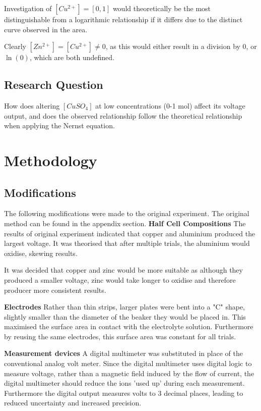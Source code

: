 \documentclass[11pt,a4paper]{article}
\begin{document}
Investigation of $[Cu^{2+}]=[0, 1]$ would theoretically be the most distinguishable from a logarithmic relationship if it differs due to the distinct curve observed in the area. 

Clearly $[Zn^{2+}]=[Cu^{2+}]\neq 0$, as this would either result in a division by 0, or $\ln(0)$, which are both undefined. 
\subsection{Research Question}
How does altering $[CuSO_4]$ at low concentrations (0-1 mol) affect its voltage output, and does the observed relationship follow the theoretical relationship when applying the Nernst equation.
\section{Methodology}
\subsection{Modifications}

The following modifications were made to the original experiment. The original method can be found in the appendix section.\newline
\textbf{Half Cell Compositions}\newline
The results of original experiment indicated that copper and aluminium produced the largest voltage. It was theorised that after multiple trials, the aluminium would oxidise, skewing results.

It was decided that copper and zinc would be more suitable as although they produced a smaller voltage, zinc would take longer to oxidise and therefore producer more consistent results.

\textbf{Electrodes}\newline
Rather than thin strips, larger plates were bent into a "C" shape, slightly smaller than the diameter of the beaker they would be placed in. This maximised the surface area in contact with the electrolyte solution. Furthermore by reusing the same electrodes, this surface area was constant for all trials.

\textbf{Measurement devices}\newline
A digital multimeter was substituted in place of the conventional analog volt meter. Since the digital multimeter uses digital logic to measure voltage, rather than a magnetic field induced by the flow of current, the digital multimeter should reduce the ions 'used up' during each measurement. Furthermore the digital output measures volts to 3 decimal places, leading to reduced uncertainty and increased precision. 
\end{document}
